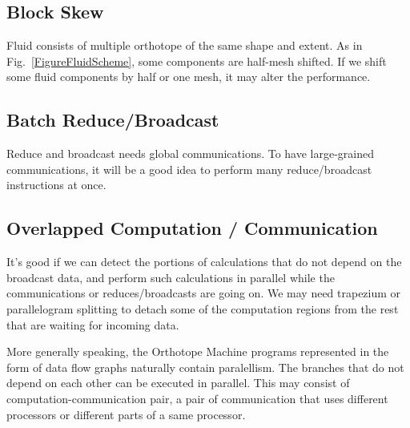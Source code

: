 \documentclass[twocolumn]{article}
\begin{document}
\subsection{Block Skew}
Fluid consists of multiple orthotope of the same shape and extent. As in
Fig.~\ref{FigureFluidScheme}, some components are half-mesh shifted. If we
shift some fluid components by half or one mesh, it may alter the performance.



\subsection{Batch Reduce/Broadcast}
Reduce and broadcast needs global communications. To have large-grained
communications, it will be a good idea to perform many reduce/broadcast
instructions at once. 

\subsection{Overlapped Computation / Communication}

It's good if we can detect the portions of calculations that do not depend on
the broadcast data, and perform such calculations in parallel while the
communications or reduces/broadcasts are going on. We may need trapezium or
parallelogram splitting to detach some of the computation regions from the
rest that are waiting for incoming data.

More generally speaking, the Orthotope Machine programs represented in
the form of data flow graphs naturally contain paralellism. The
branches that do not depend on each other can be executed in
parallel. This may consist of computation-communication pair, a pair
of communication that uses different processors or different parts of
a same processor.


\end{document}

